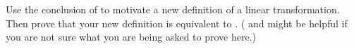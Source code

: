Use the conclusion of  to motivate a new definition of a linear transformation.  Then prove that your new definition is equivalent to .  ( and  might be helpful if you are not sure what you are being asked to prove here.)